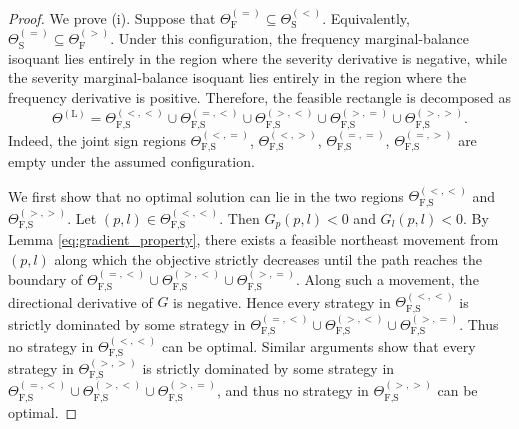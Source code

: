 \documentclass[10pt,a4paper]{amsart}
\begin{document}
\begin{proof}
We prove (i). Suppose that $\Theta_{\text{F}}^{\left(=\right)}\subseteq\Theta_{\text{S}}^{\left(<\right)}$. Equivalently, $\Theta_{\text{S}}^{\left(=\right)}\subseteq\Theta_{\text{F}}^{\left(>\right)}$. Under this configuration, the frequency marginal-balance isoquant lies entirely in the region where the severity derivative is negative, while the severity marginal-balance isoquant lies entirely in the region where the frequency derivative is positive. Therefore, the feasible rectangle is decomposed as
\begin{equation*}
\Theta^{\left(\text{L}\right)}=\Theta_{\text{F,S}}^{\left(<,<\right)}\cup\Theta_{\text{F,S}}^{\left(=,<\right)}\cup\Theta_{\text{F,S}}^{\left(>,<\right)}\cup\Theta_{\text{F,S}}^{\left(>,=\right)}\cup\Theta_{\text{F,S}}^{\left(>,>\right)}.
\end{equation*}
Indeed, the joint sign regions $\Theta_{\text{F,S}}^{\left(<,=\right)}$, $\Theta_{\text{F,S}}^{\left(<,>\right)}$, $\Theta_{\text{F,S}}^{\left(=,=\right)}$, $\Theta_{\text{F,S}}^{\left(=,>\right)}$ are empty under the assumed configuration.

We first show that no optimal solution can lie in the two regions $\Theta_{\text{F,S}}^{\left(<,<\right)}$ and $\Theta_{\text{F,S}}^{\left(>,>\right)}$. Let $\left(p,l\right)\in\Theta_{\text{F,S}}^{\left(<,<\right)}$. Then $G_p\left(p,l\right)<0$ and $G_l\left(p,l\right)<0$. By Lemma \ref{eq:gradient_property}, there exists a feasible northeast movement from $\left(p,l\right)$ along which the objective strictly decreases until the path reaches the boundary of $\Theta_{\text{F,S}}^{\left(=,<\right)}\cup\Theta_{\text{F,S}}^{\left(>,<\right)}\cup\Theta_{\text{F,S}}^{\left(>,=\right)}$. Along such a movement, the directional derivative of $G$ is negative. Hence every strategy in $\Theta_{\text{F,S}}^{\left(<,<\right)}$ is strictly dominated by some strategy in $\Theta_{\text{F,S}}^{\left(=,<\right)}\cup\Theta_{\text{F,S}}^{\left(>,<\right)}\cup\Theta_{\text{F,S}}^{\left(>,=\right)}$. Thus no strategy in $\Theta_{\text{F,S}}^{\left(<,<\right)}$ can be optimal. Similar arguments show that every strategy in $\Theta_{\text{F,S}}^{\left(>,>\right)}$ is strictly dominated by some strategy in $\Theta_{\text{F,S}}^{\left(=,<\right)}\cup\Theta_{\text{F,S}}^{\left(>,<\right)}\cup\Theta_{\text{F,S}}^{\left(>,=\right)}$, and thus no strategy in $\Theta_{\text{F,S}}^{\left(>,>\right)}$ can be optimal.


\end{proof}
\end{document}
